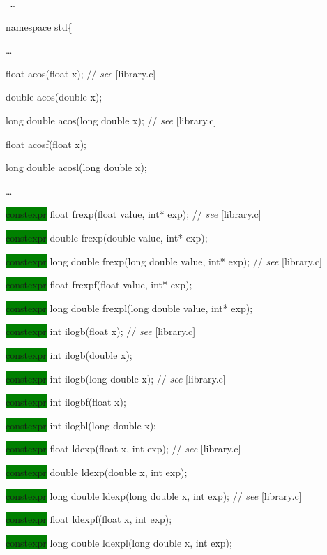 \documentclass[prd,twocolumn,amsmath,amssymb,nofootinbib,eqsecnum]{revtex4-1}
\newcommand{\code}[1]{{\tt #1}}
\newcommand{\highlight}[1]{\colorbox{green}{\!\!\!\! #1}}
\newcommand{\stdcomment}[1]{{// {\it see} [#1]}}
\begin{document}
\code{
\ldots
\vspace{2ex}

namespace std\{

\vspace{2ex}
\ldots
\vspace{2ex}

float acos(float x); \stdcomment{library.c}

double acos(double x);

long double acos(long double x); \stdcomment{library.c}

float acosf(float x);

long double acosl(long double x);

\vspace{2ex}
\ldots
\vspace{2ex}

\highlight{constexpr}  float frexp(float value, int* exp); \stdcomment{library.c}

\highlight{constexpr}  double frexp(double value, int* exp);

\highlight{constexpr}  long double frexp(long double value, int* exp); \stdcomment{library.c}

\highlight{constexpr}  float frexpf(float value, int* exp);

\highlight{constexpr}  long double frexpl(long double value, int* exp);

\vspace{2ex}

\highlight{constexpr} int ilogb(float x); \stdcomment{library.c}

\highlight{constexpr} int ilogb(double x);

\highlight{constexpr} int ilogb(long double x); \stdcomment{library.c}

\highlight{constexpr} int ilogbf(float x);

\highlight{constexpr} int ilogbl(long double x);

\vspace{2ex}

\highlight{constexpr} float ldexp(float x, int exp); \stdcomment{library.c}

\highlight{constexpr} double ldexp(double x, int exp);

\highlight{constexpr} long double ldexp(long double x, int exp); \stdcomment{library.c}

\highlight{constexpr} float ldexpf(float x, int exp);

\highlight{constexpr} long double ldexpl(long double x, int exp);

}
\end{document}
